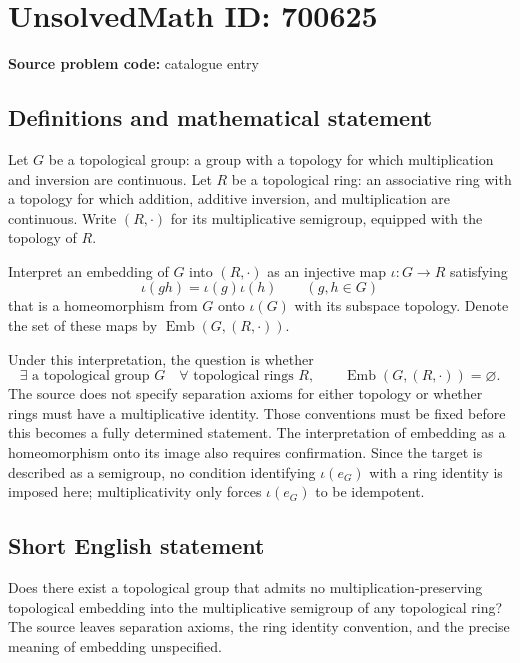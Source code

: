 \documentclass[11pt]{article}
\begin{document}
\section*{UnsolvedMath ID: 700625}
\textbf{Source problem code:} catalogue entry
\subsection{Definitions and mathematical statement}
Let \(G\) be a topological group: a group with a topology for which multiplication and inversion are continuous. Let \(R\) be a topological ring: an associative ring with a topology for which addition, additive inversion, and multiplication are continuous. Write \((R,\cdot)\) for its multiplicative semigroup, equipped with the topology of \(R\).

Interpret an embedding of \(G\) into \((R,\cdot)\) as an injective map \(\iota:G\to R\) satisfying
\[
\iota(gh)=\iota(g)\iota(h)\qquad(g,h\in G)
\]
that is a homeomorphism from \(G\) onto \(\iota(G)\) with its subspace topology. Denote the set of these maps by \(\operatorname{Emb}(G,(R,\cdot))\).

Under this interpretation, the question is whether
\[
\exists\text{ a topological group }G\quad
\forall\text{ topological rings }R,\qquad
\operatorname{Emb}(G,(R,\cdot))=\varnothing.
\]
The source does not specify separation axioms for either topology or whether rings must have a multiplicative identity. Those conventions must be fixed before this becomes a fully determined statement. The interpretation of embedding as a homeomorphism onto its image also requires confirmation. Since the target is described as a semigroup, no condition identifying \(\iota(e_G)\) with a ring identity is imposed here; multiplicativity only forces \(\iota(e_G)\) to be idempotent.
\subsection{Short English statement}
Does there exist a topological group that admits no multiplication-preserving topological embedding into the multiplicative semigroup of any topological ring? The source leaves separation axioms, the ring identity convention, and the precise meaning of embedding unspecified.
\end{document}

